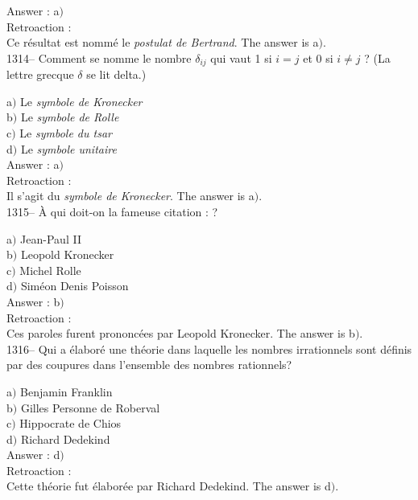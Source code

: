 ﻿\documentclass[letterpaper, 12pt]{article}
\begin{document}
Answer : a$)$\\

Retroaction : \\
Ce r\'esultat est nomm\'e le {\sl postulat de Bertrand}.
The answer is  a$)$.\\


1314-- Comment se nomme le nombre $\delta_{ij}$ qui vaut 1 si $i=j$
et 0 si $i\not=j$ ? (La lettre grecque $\delta$ se lit delta.)

a$)$ Le {\sl symbole de Kronecker} \\
b$)$ Le {\sl symbole de Rolle} \\
c$)$ Le {\sl symbole du tsar}  \\
d$)$ Le {\sl symbole unitaire}\\

Answer : a$)$\\

Retroaction : \\
Il s'agit du {\sl symbole de Kronecker}.
The answer is  a$)$.\\

1315-- \`A qui doit-on la fameuse citation : \fg ?

a$)$ Jean-Paul II \\
b$)$ Leopold Kronecker \\
c$)$ Michel Rolle  \\
d$)$ Sim\'eon Denis Poisson\\

Answer : b$)$\\

Retroaction : \\
Ces paroles furent prononc\'ees par Leopold Kronecker.
The answer is  b$)$.\\

1316-- Qui a \'elabor\'e une th\'eorie dans laquelle les nombres
irrationnels sont d\'efinis par des coupures dans l'ensemble des
nombres rationnels?

a$)$ Benjamin Franklin \\
b$)$ Gilles Personne de Roberval \\
c$)$ Hippocrate de Chios \\
d$)$ Richard Dedekind\\

Answer : d$)$\\

Retroaction : \\
Cette th\'eorie fut \'elabor\'ee par Richard Dedekind.
The answer is  d$)$.\\
\end{document}
